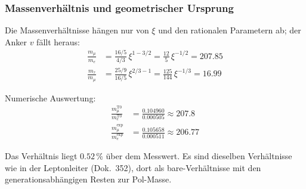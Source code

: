 	\begin{table}[h]
		\centering
		\caption{Vergleich der T0-Vorhersagen mit experimentellen Werten für geladene Leptonen (Werte aus \texttt{calc\_De.py})}
		\label{tab:lepton_comparison_direkt}
	\end{table}
	
	\subsubsection{Massenverhältnis und geometrischer Ursprung}
	
	Die Massenverhältnisse hängen nur von $\xi$ und den rationalen Parametern ab; der Anker $v$ fällt heraus:
	\begin{align}
		\frac{m_\mu}{m_e} &= \frac{16/5}{4/3}\,\xi^{1-3/2} = \frac{12}{5}\,\xi^{-1/2} = 207.85 \\
		\frac{m_\tau}{m_\mu} &= \frac{25/9}{16/5}\,\xi^{2/3-1} = \frac{125}{144}\,\xi^{-1/3} = 16.99
	\end{align}
	
	Numerische Auswertung:
	\begin{align}
		\frac{m_\mu^{\text{T0}}}{m_e^{\text{T0}}} &= \frac{0.104960}{0.000505} \approx 207.8 \\
		\frac{m_\mu^{\text{exp}}}{m_e^{\text{exp}}} &= \frac{0.105658}{0.000511} \approx 206.77
	\end{align}
	
	Das Verhältnis liegt $0.52\,\%$ über dem Messwert. Es sind dieselben Verhältnisse wie in der Leptonleiter (Dok.~352), dort als bare-Verhältnisse mit den generationsabhängigen Resten zur Pol-Masse.
	
